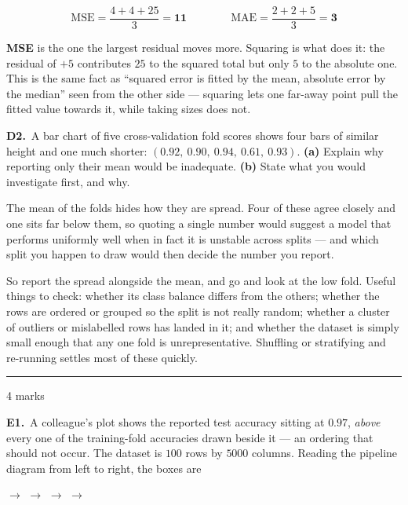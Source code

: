 \documentclass[10pt,a4paper]{article}
\newcommand{\parthead}[2]{\vspace{2pt}\noindent\rule{\linewidth}{0.4pt}\par\vspace{2pt}%
  \noindent{\bfseries Part #1}\hfill{\small #2}\par\vspace{1pt}}
\newcommand{\sol}[1]{\textbf{#1}}
\begin{document}
\[ \mathrm{MSE} = \frac{4 + 4 + 25}{3} = \sol{11} \qquad\qquad \mathrm{MAE} = \frac{2 + 2 + 5}{3} = \sol{3} \]

\sol{MSE} is the one the largest residual moves more. Squaring is what does it: the residual of $+5$ contributes $25$ to the squared total but only $5$ to the absolute one. This is the same fact as ``squared error is fitted by the mean, absolute error by the median'' seen from the other side --- squaring lets one far-away point pull the fitted value towards it, while taking sizes does not.

\vspace{6pt}

\textbf{D2.}\ A bar chart of five cross-validation fold scores shows four bars of similar height and one much shorter: $(0.92,\ 0.90,\ 0.94,\ 0.61,\ 0.93)$. \textbf{(a)} Explain why reporting only their mean would be inadequate. \textbf{(b)} State what you would investigate first, and why.

\vspace{2pt}

The mean of the folds hides how they are spread. Four of these agree closely and one sits far below them, so quoting a single number would suggest a model that performs uniformly well when in fact it is unstable across splits --- and which split you happen to draw would then decide the number you report.\par\vspace{1mm}So report the spread alongside the mean, and go and look at the low fold. Useful things to check: whether its class balance differs from the others; whether the rows are ordered or grouped so the split is not really random; whether a cluster of outliers or mislabelled rows has landed in it; and whether the dataset is simply small enough that any one fold is unrepresentative. Shuffling or stratifying and re-running settles most of these quickly.

\newpage

\parthead{E --- Reasoning}{4 marks}

\textbf{E1.}\ A colleague's plot shows the reported test accuracy sitting at $0.97$, \emph{above} every one of the
training-fold accuracies drawn beside it --- an ordering that should not occur. The dataset is $100$ rows by
$5000$ columns. Reading the pipeline diagram from left to right, the boxes are

\vspace{2mm}
\begin{center}\small
{} $\rightarrow$
 $\rightarrow$
 $\rightarrow$
 $\rightarrow$
\end{center}
\end{document}
